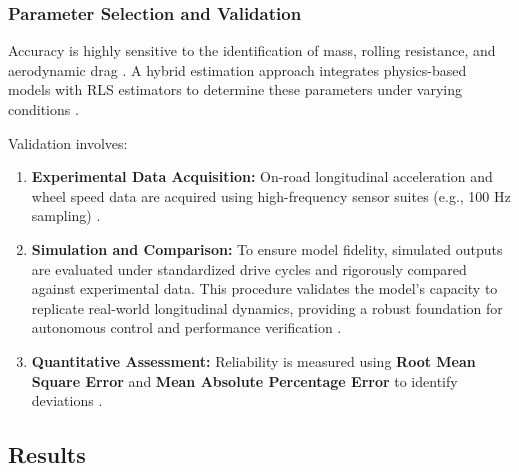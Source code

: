 \documentclass{article}
\begin{document}
\subsubsection{Parameter Selection and Validation}

Accuracy is highly sensitive to the identification of mass, rolling resistance, and aerodynamic drag  \parencite{simon_altmannshofer_f96f1956}. A hybrid estimation approach integrates physics-based models with RLS estimators to determine these parameters under varying conditions  \parencite[]{zhisong_zhou_c50a6dda, simon_altmannshofer_f96f1956}.

Validation involves:
\begin{enumerate}
\item 

\textbf{Experimental Data Acquisition:} On-road longitudinal acceleration and wheel speed data are acquired using high-frequency sensor suites (e.g., 100 Hz sampling)  \parencite{luca_castellazzi_c04b8f1a}.\item 

\textbf{Simulation and Comparison: }To ensure model fidelity, simulated outputs are evaluated under standardized drive cycles and rigorously compared against experimental data. This procedure validates the model's capacity to replicate real-world longitudinal dynamics, providing a robust foundation for autonomous control and performance verification  \parencite[]{muhammad_abdullah_7f4e5d18, luca_castellazzi_c04b8f1a}.\item 

\textbf{Quantitative Assessment:} Reliability is measured using \textbf{Root Mean Square Error} and \textbf{Mean Absolute Percentage Error} to identify deviations  \parencite[]{umair_rehman_172f6fe3, qian_song_834215fe}.
\end{enumerate}
\subsection{Results}
\end{document}
